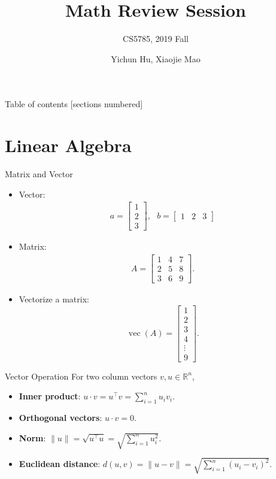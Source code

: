 \documentclass[10pt]{beamer}
\title{Math Review Session}
\subtitle{CS5785, 2019 Fall}
\date{}
\author{Yichun Hu, Xiaojie Mao}
\institute{Cornell Tech, Cornell Unviersity}
\begin{document}
\maketitle

\begin{frame}{Table of contents}
  [sections numbered]
  \tableofcontents%
\end{frame}

\section[Linear Algebra]{Linear Algebra}
\begin{frame}{Matrix and Vector}
\begin{itemize}
    \item Vector: 
    \begin{align*}
        a = \begin{bmatrix}1 \\ 2  \\ 3 \end{bmatrix}, ~~~ b = \begin{bmatrix}1 & 2  & 3 \end{bmatrix} 
    \end{align*}
    \item Matrix: 
    \begin{align*}
        A = \begin{bmatrix}1 & 4 & 7 \\ 2 & 5 & 8  \\  3 & 6 & 9 \end{bmatrix}.
    \end{align*}
    \item Vectorize a matrix: 
        \[
            \operatorname{vec}(A) = \begin{bmatrix} 1 \\ 2 \\ 3 \\ 4 \\ \vdots \\ 9 \end{bmatrix}. 
        \]
\end{itemize}
\end{frame}

\begin{frame}{Vector Operation}
    For two column vectors $v, u \in \mathbb{R}^n$, 
    \begin{itemize}
        \item \textbf{Inner product}: $u \cdot v = u^\top v = \sum_{i = 1}^n u_iv_i$. 
        \item \textbf{Orthogonal vectors}: $u \cdot v = 0$. 
        \item \textbf{Norm}: $\|u\| = \sqrt{u^\top u} = \sqrt{\sum_{i = 1}^n u_i^2}$.
        \item \textbf{Euclidean distance}: $d(u, v) = \|u - v\| = \sqrt{\sum_{i = 1}^n (u_i - v_i)^2}$. 
    \end{itemize}
\end{frame}
\end{document}
